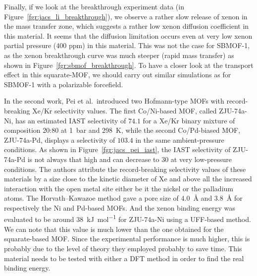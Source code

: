 \documentclass[main]{subfiles}
\begin{document}
Finally, if we look at the breakthrough experiment data (in Figure~\ref{fgr:jacs_li_breakthrough}), we observe a rather slow release of xenon in the mass transfer zone, which suggests a rather low xenon diffusion coefficient in this material. It seems that the diffusion limitation occurs even at very low xenon partial pressure (400 ppm) in this material. This was not the case for SBMOF-1, as the xenon breakthrough curve was much steeper (rapid mass transfer) as shown in Figure~\ref{fgr:sbmof_breakthrough}. To have a closer look at the transport effect in this squarate-MOF, we should carry out similar simulations as for SBMOF-1 with a polarizable forcefield. 

In the second work,\autocite{Pei_2022} Pei et al.\ introduced two Hofmann-type MOFs with record-breaking Xe/Kr selectivity values. The first Co/Ni-based MOF, called ZJU-74a-Ni, has an estimated IAST selectivity of $74.1$ for a Xe/Kr binary mixture of composition 20:80 at \SI{1}{\bar} and \SI{298}{\kelvin}, while the second Co/Pd-biased MOF, ZJU-74a-Pd, displays a selectivity of $103.4$ in the same ambient-pressure conditions. As shown in Figure~\ref{fgr:jacs_pei_iast}, the IAST selectivity of ZJU-74a-Pd is not always that high and can decrease to $30$ at very low-pressure conditions. The authors attribute the record-breaking selectivity values of these materials by a size close to the kinetic diameter of Xe and above all the increased interaction with the open metal site either be it the nickel or the palladium atoms. The Horvath–Kawazoe method gave a pore size of \SI{4.0}{\angstrom} and \SI{3.8}{\angstrom} for respectively the Ni and Pd-based MOFs. And the xenon binding energy was evaluated to be around \SI{38}{\kJ\per\mole} for ZJU-74a-Ni using a UFF-based method. We can note that this value is much lower than the one obtained for the squarate-based MOF. Since the experimental performance is much higher, this is probably due to the level of theory they employed probably to save time. This material needs to be tested with either a DFT method in order to find the real binding energy. 
\end{document}
